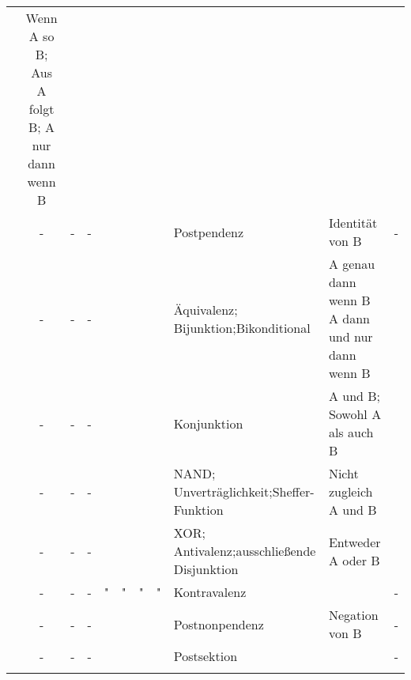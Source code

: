 \begin{table}
\begin{threeparttable}
\begin{tabularx}{\linewidth}{|c||c:cc:cccc|X:X|c|}
			& Wenn A so B; Aus A folgt B; A nur dann wenn B & \thepimp \\
			\tableline%
			\objqt{\lfloor}
			& - & - & - &\texttrue&\textfalse&\texttrue&\textfalse
			& Postpendenz & Identität von B & - \\
			\tableline%
			\objqt{\Sym{\lequiv}} \objqt{\Leftrightarrow}
			& - & - & - &\texttrue&\textfalse&\textfalse&\texttrue
			& Äquivalenz; Bijunktion;\newline Bikonditional
			& A genau dann wenn B \newline A dann und nur dann wenn B
			& \thepequiv \\
			\tableline%
			\objqt{\Sym{\land}} \objqt{\&} \objqt{\cdot}
			& - & - & - &\texttrue&\textfalse&\textfalse&\textfalse
			& Konjunktion & A und B; Sowohl A als auch B & \thepand \\
			\tablegroup%
			\rowcolor{cRareUse}
			\objqt{\Sym{\lnand}} \objqt{\barwedge} \objqt{\mid}
			& - & - & - &\textfalse&\texttrue&\texttrue&\texttrue
			& NAND; Unverträglichkeit;\newline Sheffer-Funktion
			& Nicht zugleich A und B & \thepnand \\
			\tableline%
			\objqt{\Sym{\lxor}} \objqt{\dot\lor} \objqt{\veebar} \objqt{\oplus}
			& - & - & - &\textfalse&\texttrue&\texttrue&\textfalse
			& XOR; Antivalenz;\newline ausschließende Disjunktion
			& Entweder A oder B & \thepxor \\
			\gapline%
			\objqt{\nleftrightarrow} \objqt{\nLeftrightarrow} \objqt{\nequiv}
			& - & - & - &"&"&"&"& Kontravalenz & & - \\
			\tableline%
			\objqt{\lceil}
			& - & - & - &\textfalse&\texttrue&\textfalse&\texttrue
			& Postnonpendenz & Negation von B & - \\
			\tableline%
			\objqt{\nrightarrow} \objqt{\nRightarrow} \objqt{\nsupset}
			& - & - & - &\textfalse&\texttrue&\textfalse&\textfalse
			& Postsektion & & - \\
			\tablegroup%
			\objqt{\rceil}

\end{tabularx}
\end{threeparttable}
\end{table}
